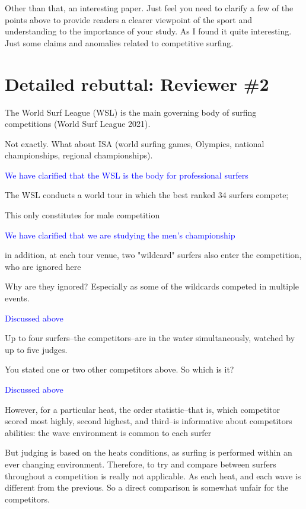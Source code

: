 \documentclass[12pt]{article}
\begin{document}
Other than that, an interesting paper. Just feel you need to clarify a
few of the points above to provide readers a clearer viewpoint of the
sport and understanding to the importance of your study. As I found it
quite interesting. Just some claims and anomalies related to
competitive surfing.
  

\section*{Detailed rebuttal: Reviewer \#2}


The World Surf League (WSL) is the main governing
body of surfing competitions (World Surf League 2021).

Not exactly. What about ISA (world surfing games, Olympics, national
championships, regional championships).


\textcolor{blue}{We have clarified that the WSL is the body for professional surfers}


The WSL conducts a
world tour in which the best ranked 34 surfers compete;

This only constitutes for male competition

\textcolor{blue}{We have clarified that we are studying the men's
  championship}

in addition, at each tour venue, two "wildcard" surfers also enter the
competition, who are ignored here

Why are they ignored? Especially as some of the wildcards competed in multiple events.

\textcolor{blue}{Discussed above}


Up to four surfers--the competitors--are in the water simultaneously,
watched by up to five judges.

You stated one or two other competitors above. So which is it?

\textcolor{blue}{Discussed above}


However, for a particular heat, the order statistic--that is, which
competitor scored most highly, second highest, and third--is
informative about competitors abilities: the wave environment is
common to each surfer

But judging is based on the heats conditions, as surfing is performed
within an ever changing environment. Therefore, to try and compare
between surfers throughout a competition is really not applicable. As
each heat, and each wave is different from the previous. So a direct
comparison is somewhat unfair for the competitors.
\end{document}

